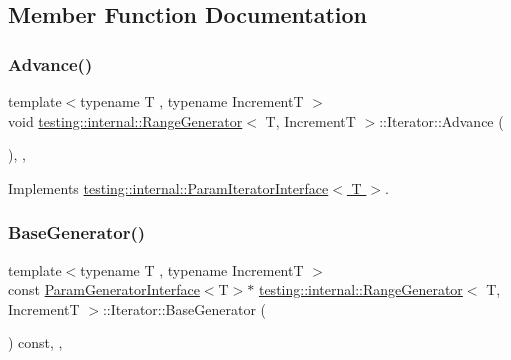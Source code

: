 \subsection{Member Function Documentation}
\mbox{\label{classtesting_1_1internal_1_1RangeGenerator_1_1Iterator_ad17bd99e352c43b8ab654a4ad479d06e}} 
\subsubsection{\texorpdfstring{Advance()}{Advance()}}
{\footnotesize\ttfamily template$<$typename T , typename IncrementT $>$ \\
void \hyperlink{classtesting_1_1internal_1_1RangeGenerator}{testing\+::internal\+::\+Range\+Generator}$<$ T, IncrementT $>$\+::Iterator\+::\+Advance (\begin{DoxyParamCaption}{ }\end{DoxyParamCaption})\hspace{0.3cm}{\ttfamily [inline]}, {\ttfamily [override]}, {\ttfamily [virtual]}}



Implements \hyperlink{classtesting_1_1internal_1_1ParamIteratorInterface_a600dbd35fcb551463e379516a1abea48}{testing\+::internal\+::\+Param\+Iterator\+Interface$<$ T $>$}.

\mbox{\label{classtesting_1_1internal_1_1RangeGenerator_1_1Iterator_aa1dc4151e1eed1c546059ecb4f72440b}} 
\subsubsection{\texorpdfstring{Base\+Generator()}{BaseGenerator()}}
{\footnotesize\ttfamily template$<$typename T , typename IncrementT $>$ \\
const \hyperlink{classtesting_1_1internal_1_1ParamGeneratorInterface}{Param\+Generator\+Interface}$<$T$>$$\ast$ \hyperlink{classtesting_1_1internal_1_1RangeGenerator}{testing\+::internal\+::\+Range\+Generator}$<$ T, IncrementT $>$\+::Iterator\+::\+Base\+Generator (\begin{DoxyParamCaption}{ }\end{DoxyParamCaption}) const\hspace{0.3cm}{\ttfamily [inline]}, {\ttfamily [override]}, {\ttfamily [virtual]}}



